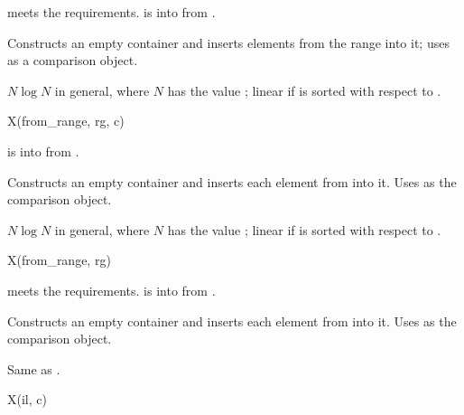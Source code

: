 \begin{itemdescr}
\pnum
\expects
{} meets the  requirements.
 is
 into  from .

\pnum
\effects
Constructs an empty container and
inserts elements from the range  into it;
uses  as a comparison object.

\pnum
\complexity
$N \log N$ in general, where $N$ has the value ;
linear if  is sorted with respect to .
\end{itemdescr}

%
%
%
%
\begin{itemdecl}
X(from_range, rg, c)
\end{itemdecl}

\begin{itemdescr}
\pnum
\expects
{} is
 into 
from .

\pnum
\effects
Constructs an empty container and
inserts each element from  into it.
Uses  as the comparison object.

\pnum
\complexity
$N \log N$ in general, where $N$ has the value ;
linear if  is sorted with respect to .
\end{itemdescr}

%
%
%
%
\begin{itemdecl}
X(from_range, rg)
\end{itemdecl}

\begin{itemdescr}
\pnum
\expects
{} meets the  requirements.
 is  into 
from .

\pnum
\effects
Constructs an empty container and
inserts each element from  into it.
Uses  as the comparison object.

\pnum
\complexity
Same as .
\end{itemdescr}

%
%
%
%
\begin{itemdecl}
X(il, c)
\end{itemdecl}

